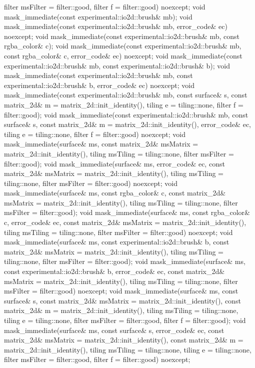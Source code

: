 \begin{codeblock}
{{{{{      filter msFilter = filter::good, filter f = filter::good) noexcept;
    void mask_immediate(const experimental::io2d::brush& mb);
    void mask_immediate(const experimental::io2d::brush& mb, error_code& ec)
      noexcept;
    void mask_immediate(const experimental::io2d::brush& mb,
      const rgba_color& c);
    void mask_immediate(const experimental::io2d::brush& mb,
      const rgba_color& c, error_code& ec) noexcept;
    void mask_immediate(const experimental::io2d::brush& mb,
      const experimental::io2d::brush& b);
    void mask_immediate(const experimental::io2d::brush& mb,
      const experimental::io2d::brush& b, error_code& ec) noexcept;
    void mask_immediate(const experimental::io2d::brush& mb, const surface& s, 
      const matrix_2d& m = matrix_2d::init_identity(), tiling e = tiling::none, 
      filter f = filter::good);
    void mask_immediate(const experimental::io2d::brush& mb, const surface& s,
      const matrix_2d& m = matrix_2d::init_identity(), error_code& ec,
      tiling e = tiling::none, filter f = filter::good) noexcept;
    void mask_immediate(surface& ms,
      const matrix_2d& msMatrix = matrix_2d::init_identity(),
      tiling msTiling = tiling::none, filter msFilter = filter::good);
    void mask_immediate(surface& ms, error_code& ec, 
      const matrix_2d& msMatrix = matrix_2d::init_identity(),
      tiling msTiling = tiling::none, filter msFilter = filter::good) noexcept;
    void mask_immediate(surface& ms, const rgba_color& c, 
      const matrix_2d& msMatrix = matrix_2d::init_identity(),
      tiling msTiling = tiling::none, filter msFilter = filter::good);
    void mask_immediate(surface& ms, const rgba_color& c, error_code& ec, 
      const matrix_2d& msMatrix = matrix_2d::init_identity(),
      tiling msTiling = tiling::none, filter msFilter = filter::good) noexcept;
    void mask_immediate(surface& ms, const experimental::io2d::brush& b, 
      const matrix_2d& msMatrix = matrix_2d::init_identity(),
      tiling msTiling = tiling::none, filter msFilter = filter::good);
    void mask_immediate(surface& ms, const experimental::io2d::brush& b,
      error_code& ec, const matrix_2d& msMatrix = matrix_2d::init_identity(),
      tiling msTiling = tiling::none, filter msFilter = filter::good) noexcept;
    void mask_immediate(surface& ms, const surface& s, 
      const matrix_2d& msMatrix = matrix_2d::init_identity(),
      const matrix_2d& m = matrix_2d::init_identity(),
      tiling msTiling = tiling::none, tiling e = tiling::none,
      filter msFilter = filter::good, filter f = filter::good);
    void mask_immediate(surface& ms, const surface& s, error_code& ec,
      const matrix_2d& msMatrix = matrix_2d::init_identity(),
      const matrix_2d& m = matrix_2d::init_identity(),
      tiling msTiling = tiling::none, tiling e = tiling::none,
      filter msFilter = filter::good, filter f = filter::good) noexcept;
    
}}}}}
\end{codeblock}
